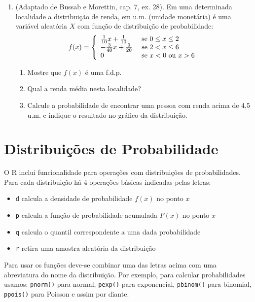 \documentclass[10pt,a4paper]{book}
\providecommand{\tightlist}{%
  \setlength{\itemsep}{0pt}\setlength{\parskip}{0pt}}
\begin{document}
\begin{enumerate}
\def\labelenumi{\arabic{enumi}.}
\tightlist
\item
  (Adaptado de Bussab e Morettin, cap. 7, ex. 28). Em uma determinada
  localidade a distribuição de renda, em u.m. (unidade monetária) é uma
  variável aleatória \(X\) com função de distribuição de probabilidade:
  \[
  f(x) = \left\{ \begin{array}{ll}
      \frac{1}{10}x + \frac{1}{10} & \mbox{ se $0 \leq x \leq 2$} \cr
      -\frac{3}{40}x + \frac{9}{20} & \mbox{ se $ 2 < x \leq 6$} \cr
      0      &      \mbox{ se $x < 0$  ou  $x > 6$}
    \end{array} \right.
  \]

  \begin{enumerate}
  \def\labelenumii{\alph{enumii}.}
  \tightlist
  \item
    Mostre que \(f(x)\) é uma f.d.p.
  \item
    Qual a renda média nesta localidade?
  \item
    Calcule a probabilidade de encontrar uma pessoa com renda acima de
    4,5 u.m. e indique o resultado no gráfico da distribuição.
  \end{enumerate}
\end{enumerate}

\section{Distribuições de
Probabilidade}\label{distribuicoes-de-probabilidade}

O R inclui funcionalidade para operações com distribuições de
probabilidades. Para cada distribuição há 4 operações básicas indicadas
pelas letras:

\begin{itemize}
\tightlist
\item
  \texttt{d} calcula a densidade de probabilidade \(f(x)\) no ponto
  \(x\)
\item
  \texttt{p} calcula a função de probabilidade acumulada \(F(x)\) no
  ponto \(x\)
\item
  \texttt{q} calcula o quantil correspondente a uma dada probabilidade
\item
  \texttt{r} retira uma amostra aleatória da distribuição
\end{itemize}

Para usar os funções deve-se combinar uma das letras acima com uma
abreviatura do nome da distribuição. Por exemplo, para calcular
probabilidades usamos: \texttt{pnorm()} para normal, \texttt{pexp()}
para exponencial, \texttt{pbinom()} para binomial, \texttt{ppois()} para
Poisson e assim por diante.
\end{document}
